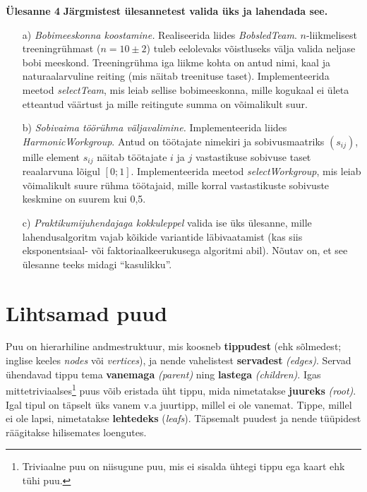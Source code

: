 \documentclass[a4paper]{article}
\begin{document}
\begin{problem}
\textbf{Ülesanne 4}
\newline
\textbf{Järgmistest ülesannetest valida üks ja lahendada see.}

\begin{enumerate}
\item[a)] {\em Bobimeeskonna koostamine.} Realiseerida liides \textit{BobsledTeam}. $n$-liikmelisest
treeningrühmast ($n=10 \pm 2$) tuleb eelolevaks võistluseks välja valida
neljase bobi meeskond. Treeningrühma iga liikme kohta on antud nimi,
kaal ja naturaalarvuline reiting (mis näitab treenituse taset).
Implementeerida meetod \textit{selectTeam}, mis leiab sellise bobimeeskonna, mille kogukaal ei
ületa etteantud väärtust ja mille reitingute summa on võimalikult suur.

 \item[b)] {\em Sobivaima töörühma väljavalimine.} Implementeerida liides \textit{HarmonicWorkgroup}. Antud on töötajate
nimekiri ja sobivusmaatriks $(s_{ij})$, mille element $s_{ij}$ näitab töötajate
$i$ ja $j$ vastastikuse sobivuse taset reaalarvuna lõigul $[0;1]$.
Implementeerida meetod \textit{selectWorkgroup}, mis leiab võimalikult suure rühma töötajaid, mille
korral vastastikuste sobivuste keskmine on suurem kui 0{,}5.


 \item[c) ] {\em Praktikumijuhendajaga kokkuleppel} valida ise üks
ülesanne, mille lahendusalgoritm vajab kõikide variantide läbivaatamist
(kas siis eks\-po\-nent\-siaal- või faktoriaalkeerukusega algoritmi abil).
Nõutav on, et see ülesanne teeks midagi "`kasulikku"'.
\end{enumerate}
\end{problem}

\section*{Lihtsamad puud}

Puu on hierarhiline andmestruktuur, mis koosneb \textbf{tippudest} (ehk sõlmedest; inglise keeles \emph{nodes} või \emph{vertices}), ja nende vahelistest \textbf{servadest} \emph{(edges)}. Servad ühendavad tippu tema \textbf{vanemaga} \emph{(parent)} ning \textbf{lastega} \emph{(children)}. Igas mittetriviaalses\footnote{Triviaalne puu on niisugune puu, mis ei sisalda ühtegi tippu ega kaart ehk tühi puu.} puus võib eristada üht tippu, mida nimetatakse \textbf{juureks} \emph{(root)}. Igal tipul on täpselt üks vanem v.a juurtipp, millel ei ole vanemat. Tippe, millel ei ole lapsi, nimetatakse \textbf{lehtedeks} (\emph{leafs}). Täpsemalt puudest ja nende tüüpidest räägitakse hilisemates loengutes.
\end{document}
